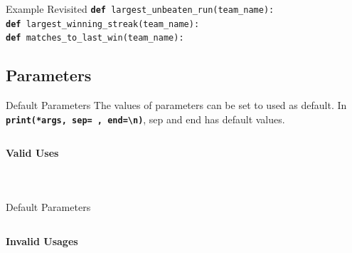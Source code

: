         \begin{frame}{Example Revisited}
            \LARGE
            \pause
            \texttt{\textbf{def} largest\_unbeaten\_run(team\_name):}\\ \pause
            \texttt{\textbf{def} largest\_winning\_streak(team\_name):}\\ \pause
            \texttt{\textbf{def} matches\_to\_last\_win(team\_name):}\\ 
        \end{frame}

      \subsection{Parameters}    
        \begin{frame}{Default Parameters}
            The values of parameters can be set to used as default.
            \newline
            In \textbf{\texttt{print(*args, sep=\textquotesingle \ \textquotesingle, end=\textquotesingle \textbackslash n\textquotesingle )}}, 
            sep and end has default values.
            \pause
            \inputminted[frame=single,framesep=2pt, lastline=15]{python3}{code-examples/default.py}
            \textbf{Valid Uses}
            \begin{columns}
                \begin{column}{0.50\textwidth}
                    \pause
                    \inputminted[frame=single,framesep=2pt, lastline=15]{python3}{code-examples/valid1.py}  
                \end{column}
                \begin{column}{0.50\textwidth}
                    \pause
                    \inputminted[frame=single,framesep=2pt, lastline=15]{python3}{code-examples/valid1_1.py}                    
                \end{column}
            \end{columns}
        \end{frame}

        \begin{frame}{Default Parameters}
            \inputminted[frame=single,framesep=2pt, lastline=15]{python3}{code-examples/default.py}
            \pause
            \LARGE
            \textbf{Invalid Usages}
            \inputminted[frame=single,framesep=2pt, lastline=15]{python3}{code-examples/valid2.py}  
        \end{frame}

